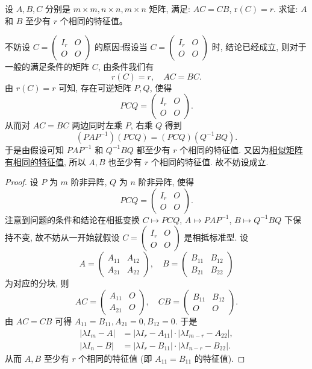 \documentclass[../../main.tex]{subfiles}%
\begin{document}
\begin{proposition}\label{proposition:AC=CB则A,B至少有r个相同特征值}
设 $A, B, C$ 分别是 $m \times m, n \times n, m \times n$ 矩阵, 满足: $AC = CB$, $\mathrm{r}(C) = r$. 求证: $A$ 和 $B$ 至少有 $r$ 个相同的特征值。
\end{proposition}
\begin{remark}
不妨设 $C = \begin{pmatrix}
I_r & O \\
O & O
\end{pmatrix}$ 的原因:假设当 $C = \begin{pmatrix}
I_r & O \\
O & O
\end{pmatrix}$ 时, 结论已经成立, 则对于一般的满足条件的矩阵 $C$, 由条件我们有
\[
r(C) = r, \quad AC = BC.
\]
由 $r(C) = r$ 可知, 存在可逆矩阵 $P, Q$, 使得
\[
PCQ = \begin{pmatrix}
I_r & O \\
O & O
\end{pmatrix}.
\]
从而对 $AC = BC$ 两边同时左乘 $P$, 右乘 $Q$ 得到
\[
(PAP^{-1})(PCQ) = (PCQ)(Q^{-1}BQ).
\]
于是由假设可知 $PAP^{-1}$ 和 $Q^{-1}BQ$ 都至少有 $r$ 个相同的特征值. 又因为\hyperref[theorem:相似矩阵有相同的特征多项式与特征值]{相似矩阵有相同的特征值}, 所以 $A, B$ 也至少有 $r$ 个相同的特征值. 故不妨设成立.
\end{remark}
\begin{proof}
设 $P$ 为 $m$ 阶非异阵, $Q$ 为 $n$ 阶非异阵, 使得
\[
PCQ = 
\begin{pmatrix}
I_r & O \\
O & O
\end{pmatrix}.
\]
注意到问题的条件和结论在相抵变换 $C \mapsto PCQ$, $A \mapsto PAP^{-1}$, $B \mapsto Q^{-1} BQ$ 下保持不变, 故不妨从一开始就假设 $C = 
\begin{pmatrix}
I_r & O \\
O & O
\end{pmatrix}$
是相抵标准型. 设
\[
A = 
\begin{pmatrix}
A_{11} & A_{12} \\
A_{21} & A_{22}
\end{pmatrix}, \quad
B = 
\begin{pmatrix}
B_{11} & B_{12} \\
B_{21} & B_{22}
\end{pmatrix}
\]
为对应的分块, 则
\[
AC = 
\begin{pmatrix}
A_{11} & O \\
A_{21} & O
\end{pmatrix}, \quad
CB = 
\begin{pmatrix}
B_{11} & B_{12} \\
O & O
\end{pmatrix}.
\]
由 $AC = CB$ 可得 $A_{11} = B_{11}, A_{21} = 0, B_{12} = 0$. 于是
\begin{align*}
| \lambda I_m - A | &= | \lambda I_r - A_{11} | \cdot | \lambda I_{m-r} - A_{22} |, \\
| \lambda I_n - B | &= | \lambda I_r - B_{11} | \cdot | \lambda I_{n-r} - B_{22} |.
\end{align*}
从而 $A, B$ 至少有 $r$ 个相同的特征值 (即 $A_{11} = B_{11}$ 的特征值).
\end{proof}
\end{document}
